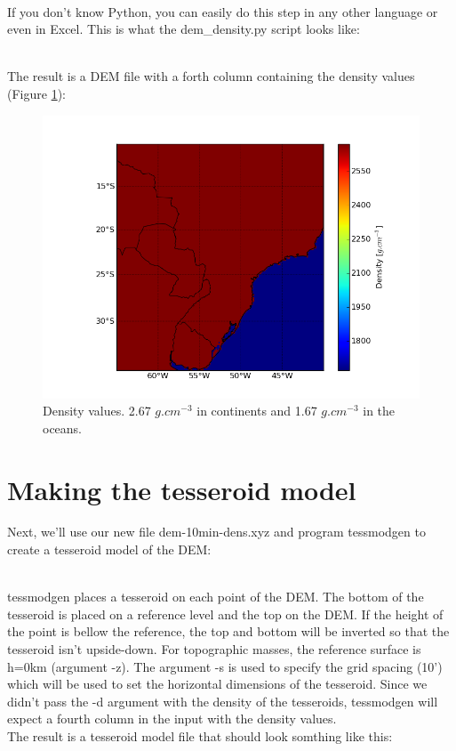 \documentclass[a4paper]{article}
\begin{document}


\hfill\\
\noindent If you don't know Python, you can easily do this step in any other language or
even in Excel. This is what the dem\_density.py script looks like:



\hfill\\
The result is a DEM file with a forth column containing the density values
(Figure \ref{fig:dem-dens}):



\begin{figure}[htb]
    \centering
        \includegraphics[width=\textwidth]{dem-10min-dens.png}
    \caption{Density values. 2.67 $g.cm^{-3}$ in continents and 1.67 $g.cm^{-3}$
             in the oceans.
    \label{fig:dem-dens}}
\end{figure}

\section{Making the tesseroid model}

Next, we'll use our new file dem-10min-dens.xyz and program tessmodgen to create
a tesseroid model of the DEM:



\hfill\\
\noindent tessmodgen places a tesseroid on each point of the DEM.
The bottom of the tesseroid is placed on a reference level and the top on the DEM.
If the height of the point is bellow the reference, the top and bottom will be inverted
so that the tesseroid isn't upside-down.
For topographic masses, the reference surface is h=0km (argument -z).
The argument -s is used to specify the grid spacing (10') which will be used to
set the horizontal dimensions of the tesseroid.
Since we didn't pass the -d argument with the density of the tesseroids, tessmodgen
will expect a fourth column in the input with the density values.
\\
\indent The result is a tesseroid model file that should look somthing like this:
\end{document}

